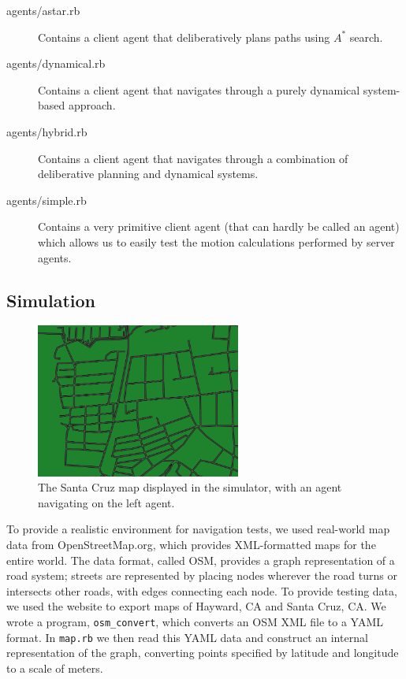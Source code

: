 \documentclass{article}
\newcommand{\code}{\texttt}
\begin{document}
\begin{description}
\item[agents/astar.rb] Contains a client agent that deliberatively
  plans paths using $A^*$ search.

\item[agents/dynamical.rb] Contains a client agent that navigates
  through a purely dynamical system-based approach.

\item[agents/hybrid.rb] Contains a client agent that navigates through
  a combination of deliberative planning and dynamical systems.

\item[agents/simple.rb] Contains a very primitive client agent (that
  can hardly be called an agent) which allows us to easily test the
  motion calculations performed by server agents.

\end{description}

\subsection{Simulation}
\begin{figure}[h]
  \begin{center}
    \includegraphics[width=0.6\textwidth]{santa_cruz}
  \end{center}
  \caption{The Santa Cruz map displayed in the simulator, with an
    agent navigating on the left agent.}
  \label{astar}
\end{figure}
To provide a realistic environment for navigation tests, we used
real-world map data from OpenStreetMap.org, which provides
XML-formatted maps for the entire world. The data format, called OSM,
provides a graph representation of a road system; streets are
represented by placing nodes wherever the road turns or intersects
other roads, with edges connecting each node. To provide testing data,
we used the website to export maps of Hayward, CA and Santa Cruz,
CA. We wrote a program, \code{osm\_convert}, which converts an OSM XML
file to a YAML format. In \code{map.rb} we then read this YAML data
and construct an internal representation of the graph, converting
points specified by latitude and longitude to a scale of meters.
\end{document}
